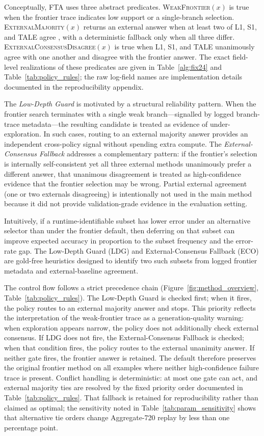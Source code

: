\documentclass[smallcondensed]{svjour3}
\begin{document}
Conceptually, FTA uses three abstract predicates.
\textsc{WeakFrontier}$(x)$ is true when the frontier trace indicates low support
or a single-branch selection.
\textsc{ExternalMajority}$(x)$ returns an external answer when at least two of
L1, S1, and TALE agree \citep{wang2023selfconsistency,muennighoff2025s1,han2025token},
with a deterministic fallback only when all three differ.
\textsc{ExternalConsensusDisagree}$(x)$ is true when L1, S1, and TALE
unanimously agree with one another and disagree with the frontier answer.
The exact field-level realizations of these predicates are given in
Table~\ref{alg:fix24} and Table~\ref{tab:policy_rules}; the raw log-field
names are implementation details documented in the reproducibility appendix.

The \emph{Low-Depth Guard} is motivated by a structural reliability pattern.
When the frontier search terminates with a single weak branch---signalled by
logged branch-trace metadata---the resulting candidate is treated as evidence
of under-exploration.
In such cases, routing to an external majority answer provides an independent
cross-policy signal without spending extra compute.
The \emph{External-Consensus Fallback} addresses a complementary pattern: if
the frontier's selection is internally self-consistent yet all three external
methods unanimously prefer a different answer, that unanimous disagreement is
treated as high-confidence evidence that the frontier selection may be wrong.
Partial external agreement (one or two externals disagreeing) is intentionally
not used in the main method because it did not provide validation-grade evidence
in the evaluation setting.

Intuitively, if a runtime-identifiable subset has lower error under an
alternative selector than under the frontier default, then deferring on that
subset can improve expected accuracy in proportion to the subset frequency and
the error-rate gap. The Low-Depth Guard (LDG) and External-Consensus Fallback
(ECO) are gold-free heuristics designed to identify two such subsets from
logged frontier metadata and external-baseline agreement.

The control flow follows a strict precedence chain
(Figure~\ref{fig:method_overview}, Table~\ref{tab:policy_rules}).
The Low-Depth Guard is checked first; when it fires, the policy routes to an
external majority answer and stops.
This priority reflects the interpretation of the weak-frontier trace as a
generation-quality warning: when exploration appears narrow, the policy does
not additionally check external consensus.
If LDG does not fire, the External-Consensus Fallback is checked; when that
condition fires, the policy routes to the external unanimity answer.
If neither gate fires, the frontier answer is retained.
The default therefore preserves the original frontier method on all examples
where neither high-confidence failure trace is present.
Conflict handling is deterministic: at most one gate can act, and external
majority ties are resolved by the fixed priority order documented in
Table~\ref{tab:policy_rules}.
That fallback is retained for reproducibility rather than claimed as optimal;
the sensitivity noted in Table~\ref{tab:param_sensitivity} shows that
alternative tie orders change Aggregate-720 replay by less than one
percentage point.
\end{document}
